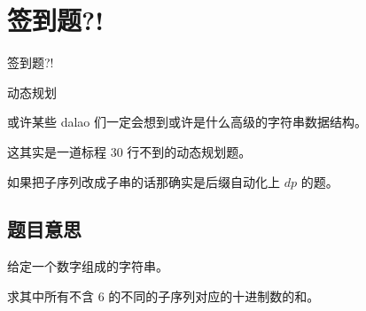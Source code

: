 \def\sectionName{签到题?!}
\section[\TOCName]{\sectionName}



\begin{frame}

\isBeamerMode\relax
    {\Huge \sectionName}\par
\fi




动态规划

或许某些 dalao 们一定会想到或许是什么高级的字符串数据结构。

这其实是一道标程 30 行不到的动态规划题。

如果把子序列改成子串的话那确实是后缀自动化上 $dp$ 的题。



\end{frame}

\subsection{题目意思}
\begin{frame} %
给定一个数字组成的字符串。

求其中所有不含 $6$ 的不同的子序列对应的十进制数的和。
\end{frame}



